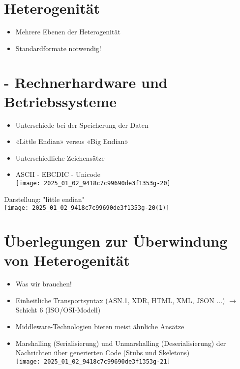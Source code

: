 \documentclass[10pt]{article}
\begin{document}
\section*{Heterogenität}
\begin{itemize}
  \item Mehrere Ebenen der Heterogenität
  \item Standardformate notwendig!
\end{itemize}

\section*{- Rechnerhardware und Betriebssysteme}
\begin{itemize}
  \item Unterschiede bei der Speicherung der Daten
  \item «Little Endian» versus «Big Endian»
  \item Unterschiedliche Zeichensätze
  \item ASCII - EBCDIC - Unicode\\
\texttt{[image: 2025\_01\_02\_9418c7c99690de3f1353g-20]}
\end{itemize}

Darstellung: "little endian"\\
\texttt{[image: 2025\_01\_02\_9418c7c99690de3f1353g-20(1)]}

\section*{Überlegungen zur Überwindung von Heterogenität}
\begin{itemize}
  \item Was wir brauchen!
  \item Einheitliche Transportsyntax (ASN.1, XDR, HTML, XML, JSON ...) $\rightarrow$ Schicht 6 (ISO/OSI-Modell)
  \item Middleware-Technologien bieten meist ähnliche Ansätze
  \item Marshalling (Serialisierung) und Unmarshalling (Deserialisierung) der Nachrichten über generierten Code (Stubs und Skeletons)\\
\texttt{[image: 2025\_01\_02\_9418c7c99690de3f1353g-21]}
\end{itemize}
\end{document}
